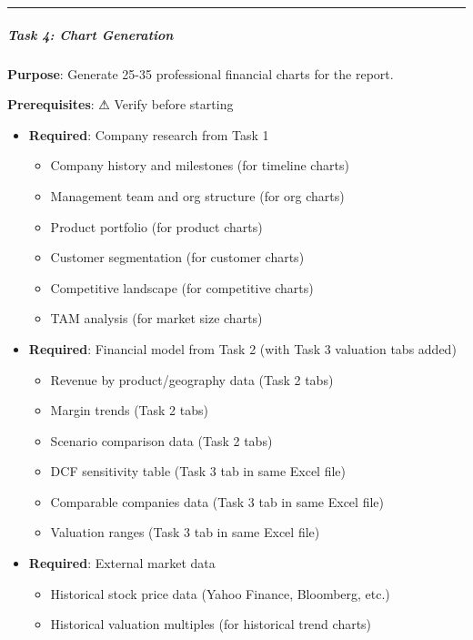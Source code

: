 \documentclass[11pt]{article}
\begin{document}
\vspace{0.5em}\hrule\vspace{0.5em}

\subparagraph{Task 4: Chart Generation}\mbox{}\par

\textbf{Purpose}: Generate 25-35 professional financial charts for the report.


\textbf{Prerequisites}: ⚠ Verify before starting

\begin{itemize}[leftmargin=*,itemsep=2pt,topsep=2pt]
\item {} \textbf{Required}: Company research from Task 1
\begin{itemize}[leftmargin=*,itemsep=2pt,topsep=2pt]
\item {} Company history and milestones (for timeline charts)
\item {} Management team and org structure (for org charts)
\item {} Product portfolio (for product charts)
\item {} Customer segmentation (for customer charts)
\item {} Competitive landscape (for competitive charts)
\item {} TAM analysis (for market size charts)
\end{itemize}
\item {} \textbf{Required}: Financial model from Task 2 (with Task 3 valuation tabs added)
\begin{itemize}[leftmargin=*,itemsep=2pt,topsep=2pt]
\item {} Revenue by product/geography data (Task 2 tabs)
\item {} Margin trends (Task 2 tabs)
\item {} Scenario comparison data (Task 2 tabs)
\item {} DCF sensitivity table (Task 3 tab in same Excel file)
\item {} Comparable companies data (Task 3 tab in same Excel file)
\item {} Valuation ranges (Task 3 tab in same Excel file)
\end{itemize}
\item {} \textbf{Required}: External market data
\begin{itemize}[leftmargin=*,itemsep=2pt,topsep=2pt]
\item {} Historical stock price data (Yahoo Finance, Bloomberg, etc.)
\item {} Historical valuation multiples (for historical trend charts)
\end{itemize}
\end{itemize}
\end{document}
